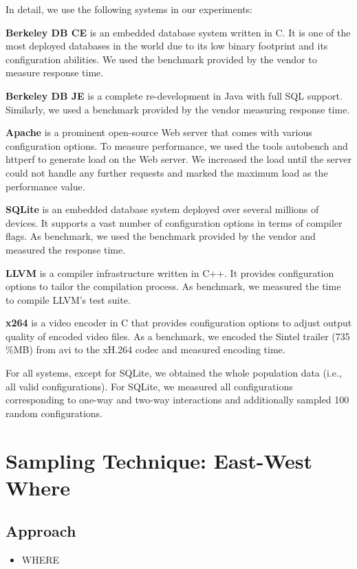 \documentclass{sig-alternative}
\newcommand{\bi}{\begin{itemize}[leftmargin=0.4cm]}
\newcommand{\ei}{\end{itemize}}
\begin{document}
In detail, we use the following systems in our experiments:
\begin{compactitem}
\item \textbf{Berkeley DB CE} is an embedded database system written in C. It is one of the most deployed databases in the world due to its low binary footprint and its configuration abilities. We used the benchmark provided by the vendor to measure response time.
\item \textbf{Berkeley DB JE} is a complete re-development in Java with full SQL support. Similarly, we used a benchmark provided by the vendor measuring response time.
\item \textbf{Apache} is a prominent open-source Web server that comes with various configuration options. To measure performance, we used the tools autobench and httperf to generate load on the Web server. We increased the load until the server could not handle any further requests and marked the maximum load as the performance value.
\item \textbf{SQLite} is an embedded database system deployed over several millions of devices. It supports a vast number of configuration options in terms of compiler flags. As benchmark, we used the benchmark provided by the vendor and measured the response time.
\item \textbf{LLVM} is a compiler infrastructure written in C++. It provides configuration options to tailor the compilation process. As benchmark, we measured the time to compile LLVM's test suite.
\item \textbf{x264} is a video encoder in C that provides configuration options to adjust output quality of encoded video files. As a benchmark, we encoded the Sintel trailer (735\,\%MB) from avi to the xH.264 codec and measured encoding time.
\end{compactitem}

For all systems, except for SQLite, we obtained the whole population data (i.e., all valid configurations). For SQLite, we measured all configurations corresponding to one-way and two-way interactions and additionally sampled 100 random configurations.

\section{Sampling Technique: East-West Where}

\subsection{Approach}
\bi
    \item{WHERE}
\ei
\end{document}
